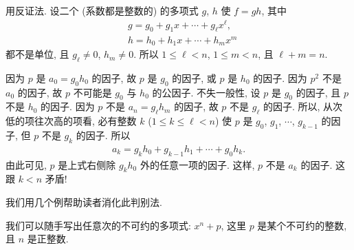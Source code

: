 \begin{pf}
    用反证法. 设二个 (系数都是整数的) 的多项式 $g$, $h$ 使 $f = gh$, 其中
    \begin{align*}
         & g = g_0 + g_1 x + \cdots + g_\ell x^\ell, \\
         & h = h_0 + h_1 x + \cdots + h_m x^m
    \end{align*}
    都不是单位, 且 $g_\ell \neq 0$, $h_m \neq 0$. 所以 $1 \leq \ell < n$, $1 \leq m < n$, 且 $\ell + m = n$.

    因为 $p$ 是 $a_0 = g_0 h_0$ 的因子, 故 $p$ 是 $g_0$ 的因子, 或 $p$ 是 $h_0$ 的因子. 因为 $p^2$ 不是 $a_0$ 的因子, 故 $p$ 不可能是 $g_0$ 与 $h_0$ 的公因子. 不失一般性, 设 $p$ 是 $g_0$ 的因子, 且 $p$ 不是 $h_0$ 的因子. 因为 $p$ 不是 $a_n = g_\ell h_m$ 的因子, 故 $p$ 不是 $g_\ell$ 的因子. 所以, 从次低的项往次高的项看, 必有整数 $k$ ($1 \leq k \leq \ell < n$) 使 $p$ 是 $g_0$, $g_1$, $\cdots$, $g_{k-1}$ 的因子, 但 $p$ 不是 $g_k$ 的因子. 所以
    \begin{align*}
        a_k = g_k h_0 + g_{k-1} h_1 + \cdots + g_0 h_k.
    \end{align*}
    由此可见, $p$ 是上式右侧除 $g_k h_0$ 外的任意一项的因子. 这样, $p$ 不是 $a_k$ 的因子. 这跟 $k < n$ 矛盾!
\end{pf}

我们用几个例帮助读者消化此判别法.

\begin{example}
    我们可以随手写出任意次的不可约的多项式: $x^n + p$, 这里 $p$ 是某个不可约的整数, 且 $n$ 是正整数.
\end{example}

